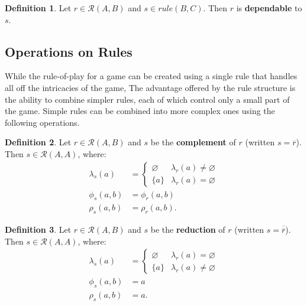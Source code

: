 \documentclass{article}
\theoremstyle{definition}
\newtheorem{definition}{Definition}[subsection]
\theoremstyle{plain}
\def\rule{\mathcal{R}}
\begin{document}
\begin{definition}
  Let $ r \in \rule (A, B) $ and $ s \in rule (B, C) $. Then $ r $ is \textbf{dependable} to $ s $.
\end{definition}

\subsection{Operations on Rules}

While the rule-of-play for a game can be created using a single rule
that handles all off the intricacies of the game,
The advantage offered by the rule structure
is the ability to combine simpler rules,
each of which control only a small part of the game.
Simple rules can be combined into more complex ones using the following operations.

\begin{definition}
  Let $ r \in \rule (A, B) $
  and $ s $ be the \textbf{complement} of $ r $ (written $ s = \overline{r} $).
  Then $ s \in \rule (A, A) $, where:
  \begin{align}
    \lambda_s (a)    & = \begin{cases}
                           \varnothing & \lambda_r (a) \neq \varnothing \\
                           \{ a \}     & \lambda_r (a) = \varnothing
                         \end{cases} \\
       \phi_s (a, b) & = \phi_r (a, b) \\
       \rho_s (a, b) & = \rho_r (a, b).
  \end{align}
\end{definition}

\begin{definition}
  Let $ r \in \rule (A, B) $
  and $ s $ be the \textbf{reduction} of $ r $ (written $ s = \overline{\overline{r}} $).
  Then $ s \in \rule (A, A) $, where:
  \begin{align}
    \lambda_s (a)    & = \begin{cases}
                           \varnothing & \lambda_r (a) = \varnothing \\
                           \{ a \}     & \lambda_r (a) \neq \varnothing
                         \end{cases} \\
       \phi_s (a, b) & = a \\
       \rho_s (a, b) & = a.
  \end{align}
\end{definition}
\end{document}
